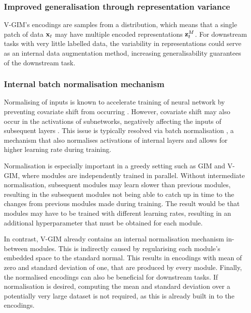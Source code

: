 	
	\subsubsection{Improved generalisation through representation variance}
		V-GIM's encodings are samples from a distribution, which means that a single patch of data $\mathbf{x}_t$ may have multiple encoded representations $\mathbf{z}_t^M$. For downstream tasks with very little labelled data, the variability in representations could serve as an internal data augmentation method, increasing generalisability guarantees of the downstream task.

	
	\subsubsection{Internal batch normalisation mechanism}
		Normalising of inputs is known to accelerate training of neural network by preventing covariate shift from occurring \cite{ioffeBatchNormalizationAccelerating2015, bjorckUnderstandingBatchNormalization2018, lecunEfficientBackProp1998}. However, covariate shift may also occur in the activations of subnetworks, negatively affecting the inputs of subsequent layers \cite{bjorckUnderstandingBatchNormalization2018}. This issue is typically resolved via batch normalisation \cite{santurkarHowDoesBatch2018, bjorckUnderstandingBatchNormalization2018}, a mechanism that also normalises activations of internal layers and allows for higher learning rate during training.
		
		Normalisation is especially important in a greedy setting such as GIM and V-GIM, where modules are independently trained in parallel. Without intermediate normalisation, subsequent modules may learn slower than previous modules, resulting in the subsequent modules not being able to catch up in time to the changes from previous modules made during training. The result would be that modules may have to be trained with different learning rates, resulting in an additional hyperparameter that must be obtained for each module.
		
		In contrast, V-GIM already contains an internal normalisation mechanism in-between modules. This is indirectly caused by regularising each module's embedded space to the standard normal. This results in encodings with mean of zero and standard deviation of one, that are produced by every module. Finally, the normalised encodings can also be beneficial for downstream tasks. If normalisation is desired, computing the mean and standard deviation over a potentially very large dataset is not required, as this is already built in to the encodings.

